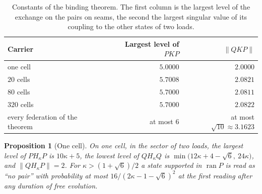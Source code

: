 \documentclass[11pt]{article}
\newtheorem{proposition}[theorem]{Proposition}
\theoremstyle{definition}
\theoremstyle{remark}
\theoremstyle{plain}
\newcommand{\ran}{\operatorname{ran}}
\begin{document}
\begin{table}[!htb]
\centering
\caption{Constants of the binding theorem. The first column is the largest
level of the exchange on the pairs on seams, the second the largest
singular value of its coupling to the other states of two loads.}
\label{tab:constants}
\begin{tabular}{@{}lrr@{}}
\toprule
Carrier & Largest level of $PKP$ & $\lVert QKP\rVert$ \\
\midrule
one cell & $5.0000$ & $2.0000$ \\
$20$ cells & $5.7008$ & $2.0821$ \\
$80$ cells & $5.7000$ & $2.0811$ \\
$320$ cells & $5.7000$ & $2.0822$ \\
\midrule
every federation of the theorem & at most $6$ & at most $\sqrt{10}\approx3.1623$ \\
\bottomrule
\end{tabular}
\end{table}

\begin{proposition}[One cell]
\label{prop:cell}
On one cell, in the sector of two loads, the largest level of
$PH_\kappa P$ is $10\kappa+5$, the lowest level of $QH_\kappa Q$ is
$\min\bigl(12\kappa+4-\sqrt6,\ 24\kappa\bigr)$, and
$\lVert QH_\kappa P\rVert=2$. For $\kappa>(1+\sqrt6)/2$ a state supported in
$\ran P$ is read as ``no pair'' with probability at most
$16/(2\kappa-1-\sqrt6)^{2}$ at the first reading after any duration of free evolution.
\end{proposition}
\end{document}
